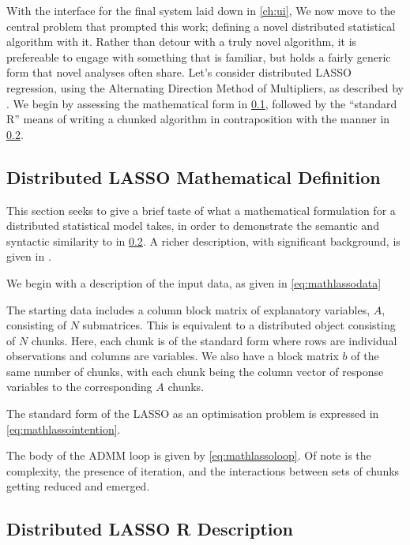 With the interface for the final system laid down in \cref{ch:ui}, We now move to the central problem that prompted this work; defining a novel distributed statistical algorithm with it.
Rather than detour with a truly novel algorithm, it is prefereable to engage with something that is familiar, but holds a fairly generic form that novel analyses often share.
Let's consider distributed LASSO regression, using the Alternating Direction Method of Multipliers, as described by \textcite{mateos2010}.
We begin by assessing the mathematical form in \cref{sec:mathlasso}, followed by the ``standard R'' means of writing a chunked algorithm in contraposition with the \lsr{} manner in \cref{sec:rlasso}.

\subsection{Distributed LASSO Mathematical Definition}\label{sec:mathlasso}

This section seeks to give a brief taste of what a mathematical formulation for a distributed statistical model takes, in order to demonstrate the semantic and syntactic similarity to \lsr{} in \cref{sec:rlasso}.
A richer description, with significant background, is given in \textcite{boyd2011}.

We begin with a description of the input data, as given in \cref{eq:mathlassodata}


The starting data includes a column block matrix of explanatory variables, $A$, consisting of $N$ submatrices.
This is equivalent to a distributed object consisting of $N$ chunks.
Here, each chunk is of the standard form where rows are individual observations and columns are variables.
We also have a block matrix $b$ of the same number of chunks, with each chunk being the column vector of response variables to the corresponding $A$ chunks.

The standard form of the LASSO as an optimisation problem is expressed in \cref{eq:mathlassointention}.


The body of the ADMM loop is given by \cref{eq:mathlassoloop}.
Of note is the complexity, the presence of iteration, and the interactions between sets of chunks getting reduced and emerged.


\subsection{Distributed LASSO R Description}\label{sec:rlasso}


